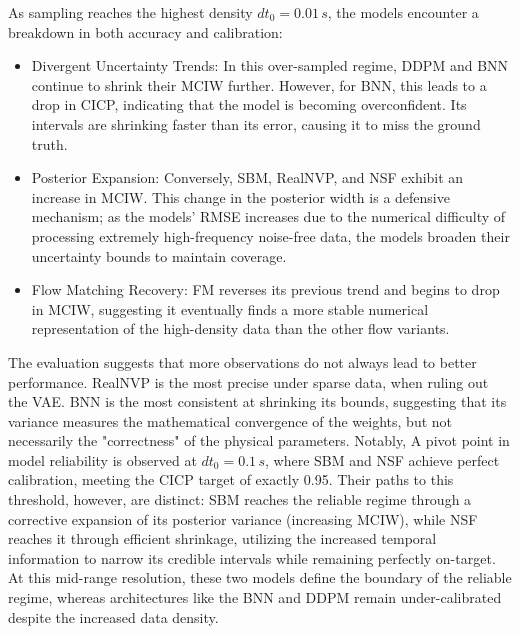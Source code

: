 As sampling reaches the highest density $dt_0=0.01\,s$, the models encounter a breakdown in both accuracy and calibration:
\begin{itemize}
\item Divergent Uncertainty Trends: In this over-sampled regime, \ac{DDPM} and \ac{BNN} continue to shrink their MCIW further. However, for \ac{BNN}, this leads to a drop in CICP, indicating that the model is becoming overconfident. Its intervals are shrinking faster than its error, causing it to miss the ground truth.
\item Posterior Expansion: Conversely, \ac{SBM}, \ac{RealNVP}, and \ac{NSF} exhibit an increase in MCIW. This change in the posterior width is a defensive mechanism; as the models' RMSE increases due to the numerical difficulty of processing extremely high-frequency noise-free data, the models broaden their uncertainty bounds to maintain coverage.
\item Flow Matching Recovery: \ac{FM} reverses its previous trend and begins to drop in MCIW, suggesting it eventually finds a more stable numerical representation of the high-density data than the other flow variants.
\end{itemize}

The evaluation suggests that more observations do not always lead to better performance. \ac{RealNVP} is the most precise under sparse data, when ruling out the \ac{VAE}. \ac{BNN} is the most consistent at shrinking its bounds, suggesting that its variance measures the mathematical convergence of the weights, but not necessarily the "correctness" of the physical parameters. Notably, A pivot point in model reliability is observed at $dt_0=0.1\,s$, where \ac{SBM} and \ac{NSF} achieve perfect calibration, meeting the CICP target of exactly 0.95. Their paths to this threshold, however, are distinct: \ac{SBM} reaches the reliable regime through a corrective expansion of its posterior variance (increasing MCIW), while \ac{NSF} reaches it through efficient shrinkage, utilizing the increased temporal information to narrow its credible intervals while remaining perfectly on-target. At this mid-range resolution, these two models define the boundary of the reliable regime, whereas architectures like the \ac{BNN} and \ac{DDPM} remain under-calibrated despite the increased data density.

